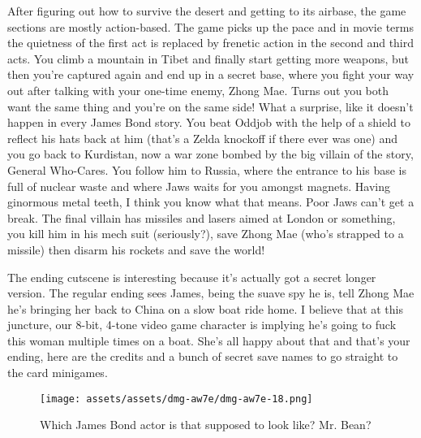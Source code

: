 \documentclass{book}
\let\oldcenter\center
\let\oldendcenter\endcenter
\renewenvironment{center}{\setlength\topsep{0pt}\oldcenter}{\oldendcenter}
\begin{document}
\begin{center}
\vspace{8pt}
\quad\vspace{4pt}
\end{center}
After figuring out how to survive the desert and getting to its airbase, the game sections are mostly action-based. The game picks up the pace and in movie terms the quietness of the first act is replaced by frenetic action in the second and third acts. You climb a mountain in Tibet and finally start getting more weapons, but then you’re captured again and end up in a secret base, where you fight your way out after talking with your one-time enemy, Zhong Mae. Turns out you both want the same thing and you’re on the same side! What a surprise, like it doesn’t happen in every James Bond story. You beat Oddjob with the help of a shield to reflect his hats back at him (that’s a Zelda knockoff if there ever was one) and you go back to Kurdistan, now a war zone bombed by the big villain of the story, General Who-Cares. You follow him to Russia, where the entrance to his base is full of nuclear waste and where Jaws waits for you amongst magnets. Having ginormous metal teeth, I think you know what that means. Poor Jaws can’t get a break. The final villain has missiles and lasers aimed at London or something, you kill him in his mech suit (seriously?), save Zhong Mae (who’s strapped to a missile) then disarm his rockets and save the world!

The ending cutscene is interesting because it’s actually got a secret longer version. The regular ending sees James, being the suave spy he is, tell Zhong Mae he’s bringing her back to China on a slow boat ride home. I believe that at this juncture, our 8-bit, 4-tone video game character is implying he’s going to fuck this woman multiple times on a boat. She’s all happy about that and that’s your ending, here are the credits and a bunch of secret save names to go straight to the card minigames.

\begin{figure}[hbt]
\vskip 10pt
\centering \texttt{[image: assets/assets/dmg-aw7e/dmg-aw7e-18.png]}\par\pagetwodescription Which James Bond actor is that supposed to look like? Mr. Bean?
\vskip 6pt
\end{figure}
\end{document}
